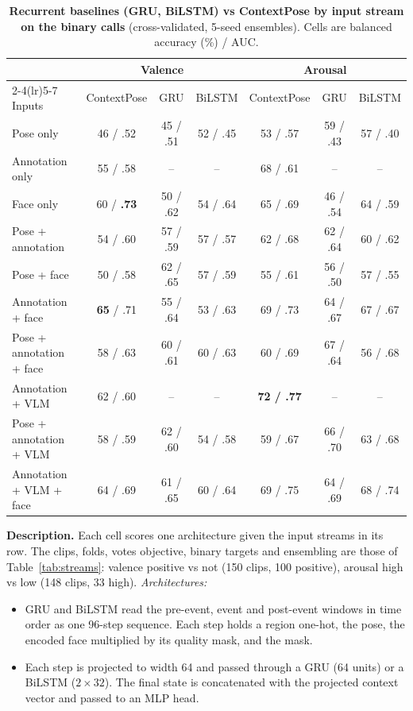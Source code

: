 \documentclass[11pt]{article}
\newcommand{\best}[1]{\textbf{#1}}
\newcommand{\tabledesc}[1]{\par\medskip\begin{minipage}{\linewidth}\footnotesize\textbf{Description.} #1\end{minipage}}
\begin{document}
\begin{table}[!htbp]
\centering
\caption{\textbf{Recurrent baselines (GRU, BiLSTM) vs ContextPose by input stream on the binary calls} (cross-validated, 5-seed ensembles). Cells are balanced accuracy (\%) / AUC.}
\label{tab:rnn}
\small
\begin{tabular}{lcccccc}
\toprule
 & \multicolumn{3}{c}{Valence} & \multicolumn{3}{c}{Arousal} \\
\cmidrule(lr){2-4}\cmidrule(lr){5-7}
Inputs & ContextPose & GRU & BiLSTM & ContextPose & GRU & BiLSTM \\
\midrule
Pose only & 46 / .52 & 45 / .51 & 52 / .45 & 53 / .57 & 59 / .43 & 57 / .40 \\
Annotation only & 55 / .58 & -- & -- & 68 / .61 & -- & -- \\
Face only & 60 / \best{.73} & 50 / .62 & 54 / .64 & 65 / .69 & 46 / .54 & 64 / .59 \\
\midrule
Pose + annotation & 54 / .60 & 57 / .59 & 57 / .57 & 62 / .68 & 62 / .64 & 60 / .62 \\
Pose + face & 50 / .58 & 62 / .65 & 57 / .59 & 55 / .61 & 56 / .50 & 57 / .55 \\
Annotation + face & \best{65} / .71 & 55 / .64 & 53 / .63 & 69 / .73 & 64 / .67 & 67 / .67 \\
\midrule
Pose + annotation + face & 58 / .63 & 60 / .61 & 60 / .63 & 60 / .69 & 67 / .64 & 56 / .68 \\
\midrule
Annotation + VLM & 62 / .60 & -- & -- & \best{72 / .77} & -- & -- \\
Pose + annotation + VLM & 58 / .59 & 62 / .60 & 54 / .58 & 59 / .67 & 66 / .70 & 63 / .68 \\
Annotation + VLM + face & 64 / .69 & 61 / .65 & 60 / .64 & 69 / .75 & 64 / .69 & 68 / .74 \\
\bottomrule
\end{tabular}
\tabledesc{Each cell scores one architecture given the input streams in its row. The clips, folds, votes objective, binary targets and ensembling are those of Table~\ref{tab:streams}: valence positive vs not (150 clips, 100 positive), arousal high vs low (148 clips, 33 high).
\emph{Architectures:}
\begin{itemize}
  \item GRU and BiLSTM read the pre-event, event and post-event windows in time order as one 96-step sequence. Each step holds a region one-hot, the pose, the encoded face multiplied by its quality mask, and the mask.
  \item Each step is projected to width 64 and passed through a GRU (64 units) or a BiLSTM ($2 \times 32$). The final state is concatenated with the projected context vector and passed to an MLP head.

\end{itemize}}
\end{table}
\end{document}
